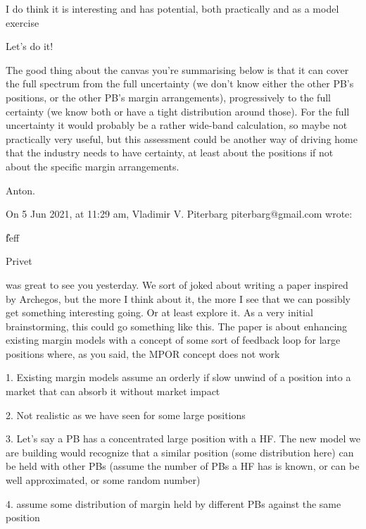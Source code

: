 \documentclass{article}
\begin{document}
I do think it is interesting and has potential, both practically and as a
model exercise

Let's do it!

The good thing about the canvas you're summarising below is that it can
cover the full spectrum from the full uncertainty (we don't know either the
other PB's positions, or the other PB's margin arrangements), progressively
to the full certainty (we know both or have a tight distribution around
those). For the full uncertainty it would probably be a rather wide-band
calculation, so maybe not practically very useful, but this assessment could
be another way of driving home that the industry needs to have certainty, at
least about the positions if not about the specific margin arrangements.

Anton.

\TEXTsymbol{>} On 5 Jun 2021, at 11:29 am, Vladimir V. Piterbarg \TEXTsymbol{%
<}piterbarg@gmail.com\TEXTsymbol{>} wrote:

\TEXTsymbol{>}

\TEXTsymbol{>} \U{feff}

\TEXTsymbol{>} Privet

\TEXTsymbol{>}

\TEXTsymbol{>} was great to see you yesterday. We sort of joked about
writing a paper inspired by Archegos, but the more I think about it, the
more I see that we can possibly get something interesting going. Or at least
explore it. As a very initial brainstorming, this could go something like
this. The paper is about enhancing existing margin models with a concept of
some sort of feedback loop for large positions where, as you said, the MPOR
concept does not work

\TEXTsymbol{>}

\TEXTsymbol{>} 1. Existing margin models assume an orderly if slow unwind of
a position into a market that can absorb it without market impact

\TEXTsymbol{>} 2. Not realistic as we have seen for some large positions

\TEXTsymbol{>} 3. Let's say a PB has a concentrated large position with a
HF. The new model we are building would recognize that a similar position
(some distribution here) can be held with other PBs (assume the number of
PBs a HF has is known, or can be well approximated, or some random number)

\TEXTsymbol{>} 4. assume some distribution of margin held by different PBs
against the same position
\end{document}
